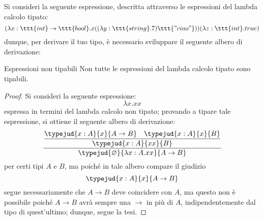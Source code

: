 \documentclass[a4paper, 12pt]{report}
\begin{document}
    \begin{example}
        Si consideri la seguente espressione, descritta attraverso le espressioni del lambda calcolo tipato: $$(\lambda x:\ttt{int}\to \ttt{bool}.x((\lambda y:\ttt{string}.7)\ttt{"ciao"}))(\lambda z: \ttt{int}.true)$$ dunque, per derivare il tuo tipo, è necessario sviluppare il seguente albero di derivazione: 
    \end{example}

    \begin{framedlem}{Espressioni non tipabili}
        Non tutte le espressioni del lambda calcolo tipato sono tipabili.
    \end{framedlem}

    \begin{proof}
        Si consideri la seguente espressione: $$\lambda x. xx$$ espressa in termini del lambda calcolo non tipato; provando a tipare tale espressione, si ottiene il seguente albero di derivazione: $$\dfrac{\dfrac{\typejud{x:A}{x}{A \to B} \quad \typejud{x:A}{x}{B}}{\typejud{x:A}{xx}{B}}}{\typejud{\varnothing}{\lambda x: A .xx}{A \to B}}$$ per certi tipi $A$ e $B$, ma poiché in tale albero compare il giudizio $$\typejud{x:A}{x}{A \to B}$$ segue necessariamente che $A \to B$ deve coincidere con $A$, ma questo non è possibile poiché $A \to B$ avrà sempre una $\to$ in più di $A$, indipendentemente dal tipo di quest'ultimo; dunque, segue la tesi.
    \end{proof}
\end{document}
